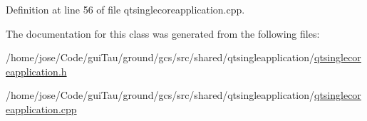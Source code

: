Definition at line 56 of file qtsinglecoreapplication.\-cpp.



The documentation for this class was generated from the following files\-:\begin{DoxyCompactItemize}
\item 
/home/jose/\-Code/gui\-Tau/ground/gcs/src/shared/qtsingleapplication/\hyperlink{qtsinglecoreapplication_8h}{qtsinglecoreapplication.\-h}\item 
/home/jose/\-Code/gui\-Tau/ground/gcs/src/shared/qtsingleapplication/\hyperlink{qtsinglecoreapplication_8cpp}{qtsinglecoreapplication.\-cpp}\end{DoxyCompactItemize}

